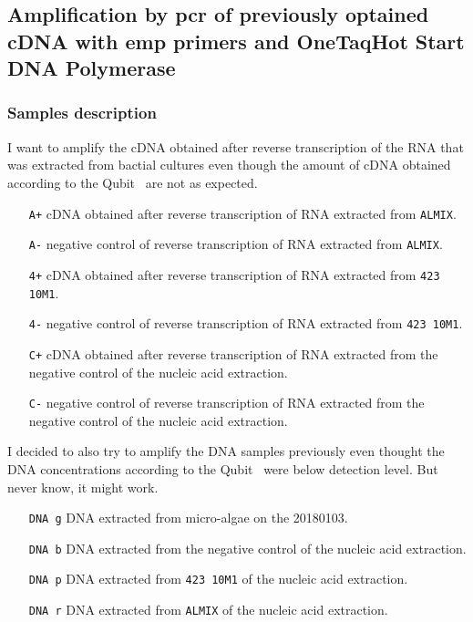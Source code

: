 \subsection{Amplification by \gls{pcr} of previously optained cDNA with \gls{emp} primers and OneTaq\cR Hot Start DNA Polymerase}
\label{task:20180117_cj0}

\subsubsection{Samples description}

I want to amplify the cDNA obtained after reverse transcription of the RNA that was extracted from bactial cultures even though the amount of cDNA obtained according to the Qubit\texttrademark~ are not as expected. 
\begin{itemize}
\item[\texttt{A+}] cDNA obtained after reverse transcription of RNA extracted from \texttt{ALMIX}.
\item[\texttt{A-}] negative control of reverse transcription of RNA extracted from \texttt{ALMIX}.
\item[\texttt{4+}] cDNA obtained after reverse transcription of RNA extracted from \texttt{423 10M1}.
\item[\texttt{4-}] negative control of reverse transcription of RNA extracted from \texttt{423 10M1}.
\item[\texttt{C+}] cDNA obtained after reverse transcription of RNA extracted from the negative control of the nucleic acid extraction.
\item[\texttt{C-}] negative control of reverse transcription of RNA extracted from the negative control of the nucleic acid extraction.
\end{itemize}

I decided to also try to amplify the DNA samples previously even thought the DNA concentrations according to the Qubit\texttrademark~ were below detection level. But never know, it might work.
\begin{itemize}
\item[\texttt{DNA g}] DNA extracted from micro-algae on the 20180103.
\item[\texttt{DNA b}] DNA extracted from the negative control of the nucleic acid extraction.
\item[\texttt{DNA p}] DNA extracted from \texttt{423 10M1} of the nucleic acid extraction.
\item[\texttt{DNA r}] DNA extracted from \texttt{ALMIX} of the nucleic acid extraction.
\end{itemize}



